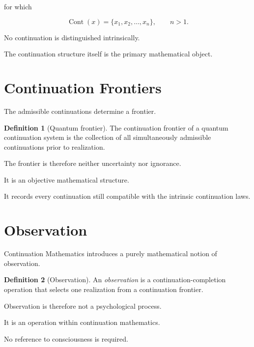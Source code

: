 \documentclass[13pt,openany]{book}
\theoremstyle{plain}
\theoremstyle{definition}
\newtheorem{definition}{Definition}[chapter]
\begin{document}
for which

\[
\operatorname{Cont}(x)
=
\{x_1,x_2,\ldots,x_n\},
\qquad
n>1.
\]

No continuation is distinguished intrinsically.

The continuation structure itself is the primary mathematical object.

\section{Continuation Frontiers}

The admissible continuations determine a frontier.

\begin{definition}[Quantum frontier]
The continuation frontier of a quantum continuation system is the collection of
all simultaneously admissible continuations prior to realization.
\end{definition}

The frontier is therefore neither uncertainty nor ignorance.

It is an objective mathematical structure.

It records every continuation still compatible with the intrinsic continuation
laws.

\section{Observation}

Continuation Mathematics introduces a purely mathematical notion of
observation.

\begin{definition}[Observation]
An \emph{observation} is a continuation-completion operation that selects one
realization from a continuation frontier.
\end{definition}

Observation is therefore not a psychological process.

It is an operation within continuation mathematics.

No reference to consciousness is required.

\end{document}
